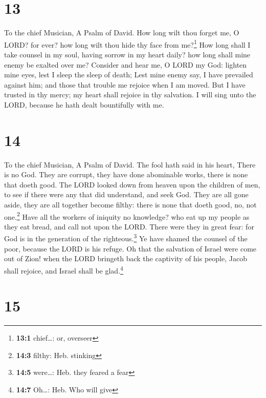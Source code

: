 \hypertarget{section-12}{%
\section{13}\label{section-12}}

To the chief Musician, A Psalm of David.  How long wilt
thou forget me, O LORD? for ever? how long wilt thou hide thy face from
me?\footnote{\textbf{13:1} chief\ldots: or, overseer}  How
long shall I take counsel in my soul, having sorrow in my heart daily?
how long shall mine enemy be exalted over me?  Consider
and hear me, O LORD my God: lighten mine eyes, lest I sleep the sleep of
death;  Lest mine enemy say, I have prevailed against him;
and those that trouble me rejoice when I am moved.  But I
have trusted in thy mercy; my heart shall rejoice in thy salvation.
 I will sing unto the LORD, because he hath dealt
bountifully with me.

\hypertarget{section-13}{%
\section{14}\label{section-13}}

To the chief Musician, A Psalm of David.  The fool hath
said in his heart, There is no God. They are corrupt, they have done
abominable works, there is none that doeth good.  The LORD
looked down from heaven upon the children of men, to see if there were
any that did understand, and seek God.  They are all gone
aside, they are all together become filthy: there is none that doeth
good, no, not one.\footnote{\textbf{14:3} filthy: Heb. stinking}
 Have all the workers of iniquity no knowledge? who eat up
my people as they eat bread, and call not upon the LORD. 
There were they in great fear: for God is in the generation of the
righteous.\footnote{\textbf{14:5} were\ldots: Heb. they feared a fear}
 Ye have shamed the counsel of the poor, because the LORD
is his refuge.  Oh that the salvation of Israel were come
out of Zion! when the LORD bringeth back the captivity of his people,
Jacob shall rejoice, and Israel shall be glad.\footnote{\textbf{14:7}
  Oh\ldots: Heb. Who will give}

\hypertarget{section-14}{%
\section{15}\label{section-14}}

